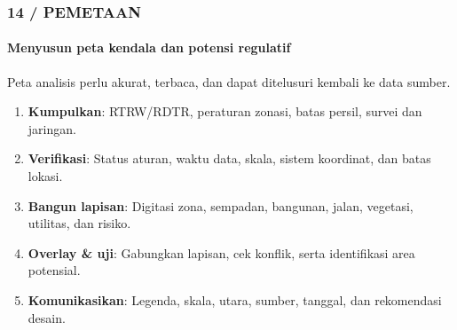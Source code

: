 \documentclass[../main.tex]{subfiles}
\begin{document}
\begin{frame}[mytitle=standard,t,mycolor=digiPH_gray!10]
	\frametitle{14 / PEMETAAN}
	\framesubtitle{Menyusun peta kendala dan potensi regulatif}

	Peta analisis perlu akurat, terbaca, dan dapat ditelusuri kembali ke data sumber.

	\begin{enumerate}
		\item \textbf{Kumpulkan}: RTRW/RDTR, peraturan zonasi, batas persil, survei dan jaringan.
		\item \textbf{Verifikasi}: Status aturan, waktu data, skala, sistem koordinat, dan batas lokasi.
		\item \textbf{Bangun lapisan}: Digitasi zona, sempadan, bangunan, jalan, vegetasi, utilitas, dan risiko.
		\item \textbf{Overlay \& uji}: Gabungkan lapisan, cek konflik, serta identifikasi area potensial.
		\item \textbf{Komunikasikan}: Legenda, skala, utara, sumber, tanggal, dan rekomendasi desain.
	\end{enumerate}
\end{frame}
\end{document}
